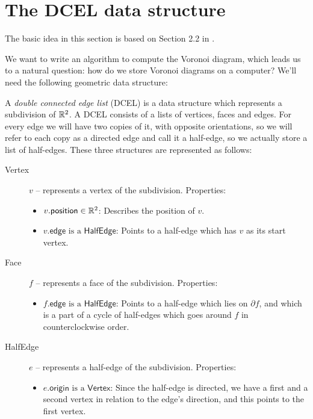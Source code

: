 %
%

\section{The DCEL data structure}
The basic idea in this section is based on Section 2.2 in \cite{CompGeo}.

We want to write an algorithm to compute the Voronoi diagram, which leads us to a natural question: how do we store Voronoi diagrams on a computer?  We'll need the following geometric data structure:
\begin{defn}[DCEL] \label{defn:dcel}
A \emph{double connected edge list} (DCEL) is a data structure which represents a subdivision of $\mathbb{R}^2$. A DCEL consists of a lists of vertices, faces and edges. For every edge we will have two copies of it, with opposite orientations, so we will refer to each copy as a directed edge and call it a half-edge, so we actually store a list of half-edges. These three structures are represented as follows:
\begin{description}
  \item[\textsf{Vertex}] $v$ -- represents a vertex of the subdivision. Properties:
  \begin{itemize}
    \item $v.\textsf{position} \in \mathbb{R}^2$: Describes the position of $v$.
    \item $v.\textsf{edge} \text{ is a } \textsf{HalfEdge}$: Points to a half-edge which has $v$ as its start vertex.
  \end{itemize}
  \item[\textsf{Face}] $f$ -- represents a face of the subdivision. Properties:
  \begin{itemize}
    \item $f.\textsf{edge} \text{ is a } \textsf{HalfEdge}$: Points to a half-edge which lies on $\partial f$, and which is a part of a cycle of half-edges which goes around $f$ in counterclockwise order.
  \end{itemize}
  \item[\textsf{HalfEdge}] $e$ -- represents a half-edge of the subdivision. Properties:
  \begin{itemize}
    \item $e.\textsf{origin} \text{ is a } \textsf{Vertex}$: Since the half-edge is directed, we have a first and a second vertex in relation to the edge's direction, and this points to the first vertex.

\end{itemize}
\end{description}
\end{defn}
